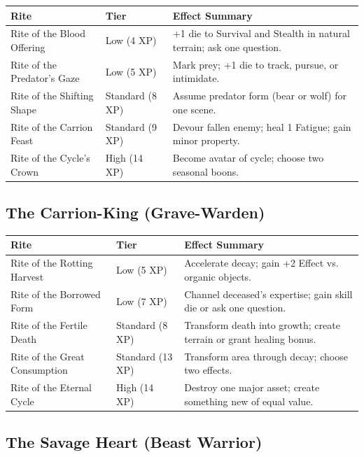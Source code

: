 \begin{longtable}{p{} p{} p{}}
\hline
\textbf{Rite} & \textbf{Tier} & \textbf{Effect Summary} \\
\hline
Rite of the Blood Offering & Low (4 XP) & +1 die to Survival and Stealth in natural terrain; ask one question. \\
Rite of the Predator's Gaze & Low (5 XP) & Mark prey; +1 die to track, pursue, or intimidate. \\
Rite of the Shifting Shape & Standard (8 XP) & Assume predator form (bear or wolf) for one scene. \\
Rite of the Carrion Feast & Standard (9 XP) & Devour fallen enemy; heal 1 Fatigue; gain minor property. \\
Rite of the Cycle's Crown & High (14 XP) & Become avatar of cycle; choose two seasonal boons. \\
\hline
\end{longtable}

\subsection{The Carrion-King (Grave-Warden)}

\begin{longtable}{p{} p{} p{}}
\hline
\textbf{Rite} & \textbf{Tier} & \textbf{Effect Summary} \\
\hline
Rite of the Rotting Harvest & Low (5 XP) & Accelerate decay; gain +2 Effect vs. organic objects. \\
Rite of the Borrowed Form & Low (7 XP) & Channel deceased's expertise; gain skill die or ask one question. \\
Rite of the Fertile Death & Standard (8 XP) & Transform death into growth; create terrain or grant healing bonus. \\
Rite of the Great Consumption & Standard (13 XP) & Transform area through decay; choose two effects. \\
Rite of the Eternal Cycle & High (14 XP) & Destroy one major asset; create something new of equal value. \\
\hline
\end{longtable}

\subsection{The Savage Heart (Beast Warrior)}

